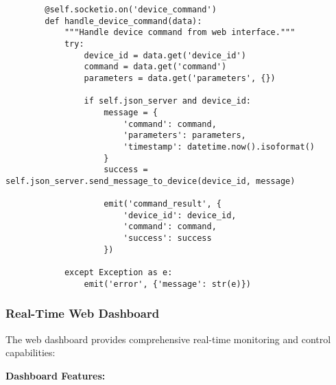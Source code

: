 \documentclass[11pt,a4paper]{article}
\begin{document}
\begin{verbatim}
        @self.socketio.on('device_command')
        def handle_device_command(data):
            """Handle device command from web interface."""
            try:
                device_id = data.get('device_id')
                command = data.get('command')
                parameters = data.get('parameters', {})

                if self.json_server and device_id:
                    message = {
                        'command': command,
                        'parameters': parameters,
                        'timestamp': datetime.now().isoformat()
                    }
                    success = self.json_server.send_message_to_device(device_id, message)

                    emit('command_result', {
                        'device_id': device_id,
                        'command': command,
                        'success': success
                    })

            except Exception as e:
                emit('error', {'message': str(e)})
\end{verbatim}

\subsubsection{Real-Time Web Dashboard}

The web dashboard provides comprehensive real-time monitoring and control capabilities:

\textbf{Dashboard Features:}
\end{document}
